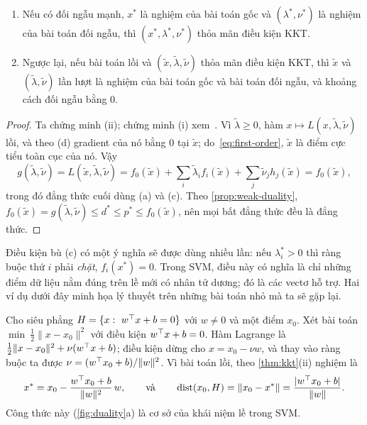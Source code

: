 \begin{theorem}\label{thm:kkt}
\begin{enumerate}[label=(\roman*),leftmargin=2em]
\item Nếu có đối ngẫu mạnh, $x^\ast$ là nghiệm của bài toán gốc và $(\lambda^\ast,\nu^\ast)$ là nghiệm của bài toán đối ngẫu, thì $(x^\ast,\lambda^\ast,\nu^\ast)$ thỏa mãn điều kiện KKT.
\item Ngược lại, nếu bài toán lồi và $(\tilde x,\tilde\lambda,\tilde\nu)$ thỏa mãn điều kiện KKT, thì $\tilde x$ và $(\tilde\lambda,\tilde\nu)$ lần lượt là nghiệm của bài toán gốc và bài toán đối ngẫu, và khoảng cách đối ngẫu bằng $0$.
\end{enumerate}
\end{theorem}

\begin{proof}
Ta chứng minh (ii); chứng minh (i) xem~\cite[Mục~5.5.3]{boyd2004}. Vì $\tilde\lambda\ge0$, hàm $x\mapsto L(x,\tilde\lambda,\tilde\nu)$ lồi, và theo (d) gradient của nó bằng $0$ tại $\tilde x$; do~\eqref{eq:first-order}, $\tilde x$ là điểm cực tiểu toàn cục của nó. Vậy
\[
g(\tilde\lambda,\tilde\nu)=L(\tilde x,\tilde\lambda,\tilde\nu)=f_0(\tilde x)+\sum_i\tilde\lambda_if_i(\tilde x)+\sum_j\tilde\nu_jh_j(\tilde x)=f_0(\tilde x),
\]
trong đó đẳng thức cuối dùng (a) và (c). Theo \cref{prop:weak-duality}, $f_0(\tilde x)=g(\tilde\lambda,\tilde\nu)\le d^\ast\le p^\ast\le f_0(\tilde x)$, nên mọi bất đẳng thức đều là đẳng thức.
\end{proof}

Điều kiện bù (c) có một ý nghĩa sẽ được dùng nhiều lần: nếu $\lambda_i^\ast>0$ thì ràng buộc thứ $i$ phải \emph{chặt}, $f_i(x^\ast)=0$. Trong SVM, điều này có nghĩa là chỉ những điểm dữ liệu nằm đúng trên lề mới có nhân tử dương; đó là các vectơ hỗ trợ. Hai ví dụ dưới đây minh họa lý thuyết trên những bài toán nhỏ mà ta sẽ gặp lại.

\begin{example}\label{ex:distance}
Cho siêu phẳng $H=\{x:\ w^\top x+b=0\}$ với $w\neq0$ và một điểm $x_0$. Xét bài toán $\min\ \frac12\|x-x_0\|^2$ với điều kiện $w^\top x+b=0$. Hàm Lagrange là $\frac12\|x-x_0\|^2+\nu(w^\top x+b)$; điều kiện dừng cho $x=x_0-\nu w$, và thay vào ràng buộc ta được $\nu=(w^\top x_0+b)/\|w\|^2$. Vì bài toán lồi, theo \cref{thm:kkt}(ii) nghiệm là
\[
x^\ast=x_0-\frac{w^\top x_0+b}{\|w\|^2}\,w,\qquad\text{và}\qquad \operatorname{dist}(x_0,H)=\|x_0-x^\ast\|=\frac{|w^\top x_0+b|}{\|w\|}.
\]
Công thức này (\cref{fig:duality}a) là cơ sở của khái niệm lề trong SVM.
\end{example}

